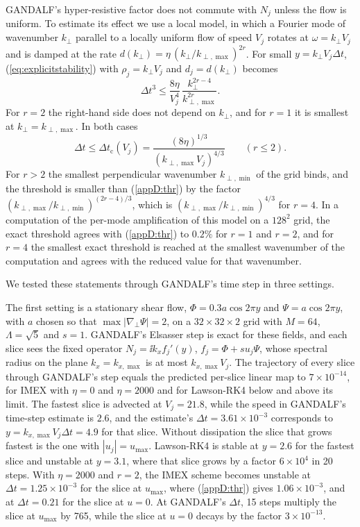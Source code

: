 GANDALF's hyper-resistive factor does not commute with $N_j$ unless the flow is uniform. To estimate its effect we use a local model, in which a Fourier mode of wavenumber $k_\perp$ parallel to a locally uniform flow of speed $V_j$ rotates at $\omega=k_\perp V_j$ and is damped at the rate $d(k_\perp)=\eta\,(k_\perp/k_{\perp,\max})^{2r}$. For small $y=k_\perp V_j\Delta t$, (\ref{eq:explicitstability}) with $\rho_j=k_\perp V_j$ and $d_j=d(k_\perp)$ becomes
\begin{equation*}
  \Delta t^3\le\frac{8\eta}{V_j^4}\,\frac{k_\perp^{2r-4}}{k_{\perp,\max}^{2r}} .
\end{equation*}
For $r=2$ the right-hand side does not depend on $k_\perp$, and for $r=1$ it is smallest at $k_\perp=k_{\perp,\max}$. In both cases
\begin{equation}\label{appD:thr}
  \Delta t\le\Delta t_{\mathrm c}(V_j)=\frac{(8\eta)^{1/3}}{(k_{\perp,\max}V_j)^{4/3}}\qquad(r\le2).
\end{equation}
For $r>2$ the smallest perpendicular wavenumber $k_{\perp,\min}$ of the grid binds, and the threshold is smaller than (\ref{appD:thr}) by the factor $(k_{\perp,\max}/k_{\perp,\min})^{(2r-4)/3}$, which is $(k_{\perp,\max}/k_{\perp,\min})^{4/3}$ for $r=4$. In a computation of the per-mode amplification of this model on a $128^2$ grid, the exact threshold agrees with (\ref{appD:thr}) to $0.2\%$ for $r=1$ and $r=2$, and for $r=4$ the smallest exact threshold is reached at the smallest wavenumber of the computation and agrees with the reduced value for that wavenumber.

We tested these statements through GANDALF's time step in three settings.

The first setting is a stationary shear flow, $\Phi=0.3a\cos2\pi y$ and $\Psi=a\cos2\pi y$, with $a$ chosen so that $\max|\nabla_\perp\Psi|=2$, on a $32\times32\times2$ grid with $M=64$, $\Lambda=\sqrt5$ and $s=1$. GANDALF's Elsasser step is exact for these fields, and each slice sees the fixed operator $N_j=\ii k_xf_j'(y)$, $f_j=\Phi+su_j\Psi$, whose spectral radius on the plane $k_x=k_{x,\max}$ is at most $k_{x,\max}V_j$. The trajectory of every slice through GANDALF's step equals the predicted per-slice linear map to $7\times10^{-14}$, for IMEX with $\eta=0$ and $\eta=2000$ and for Lawson-RK4 below and above its limit. The fastest slice is advected at $V_j=21.8$, while the speed in GANDALF's time-step estimate is $2.6$, and the estimate's $\Delta t=3.61\times10^{-3}$ corresponds to $y=k_{x,\max}V_j\Delta t=4.9$ for that slice. Without dissipation the slice that grows fastest is the one with $|u_j|=u_{\max}$. Lawson-RK4 is stable at $y=2.6$ for the fastest slice and unstable at $y=3.1$, where that slice grows by a factor $6\times10^4$ in 20 steps. With $\eta=2000$ and $r=2$, the IMEX scheme becomes unstable at $\Delta t=1.25\times10^{-3}$ for the slice at $u_{\max}$, where (\ref{appD:thr}) gives $1.06\times10^{-3}$, and at $\Delta t=0.21$ for the slice at $u=0$. At GANDALF's $\Delta t$, 15 steps multiply the slice at $u_{\max}$ by 765, while the slice at $u=0$ decays by the factor $3\times10^{-13}$.

